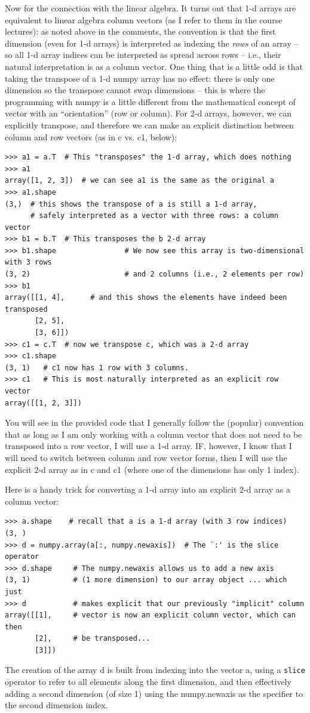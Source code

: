 \documentclass[10pt]{article}
\begin{document}
Now for the connection with the linear algebra.  It turns out that 1-d arrays are equivalent to linear algebra column vectors (as I refer to them in the course lectures): as noted above in the comments, the convention is that the first dimension (even for 1-d arrays) is interpreted as indexing the {\em rows} of an array -- so all 1-d array indices can be interpreted as spread across rows -- i.e., their natural interpretation is as a column vector.  One thing that is a little odd is that taking the transpose of a 1-d numpy array has no effect: there is only one dimension so the transpose cannot swap dimensions -- this is where the programming with numpy is a little different from the mathematical concept of vector with an ``orientation'' (row or column).  For 2-d arrays, however, we can explicitly transpose, and therefore we can make an explicit distinction between column and row vectors (as in c vs. c1, below):
\begin{verbatim}
>>> a1 = a.T  # This "transposes" the 1-d array, which does nothing
>>> a1
array([1, 2, 3])  # we can see a1 is the same as the original a
>>> a1.shape
(3,)  # this shows the transpose of a is still a 1-d array,
      # safely interpreted as a vector with three rows: a column vector
>>> b1 = b.T  # This transposes the b 2-d array
>>> b1.shape                # We now see this array is two-dimensional with 3 rows 
(3, 2)                      # and 2 columns (i.e., 2 elements per row)
>>> b1
array([[1, 4],      # and this shows the elements have indeed been transposed
       [2, 5],
       [3, 6]])
>>> c1 = c.T  # now we transpose c, which was a 2-d array
>>> c1.shape
(3, 1)   # c1 now has 1 row with 3 columns.
>>> c1   # This is most naturally interpreted as an explicit row vector
array([[1, 2, 3]])
\end{verbatim}
You will see in the provided code that I generally follow the (popular) convention that as long as I am only working with a column vector that does not need to be transposed into a row vector, I will use a 1-d array.  IF, however, I know that I will need to switch between column and row vector forms, then I will use the explicit 2-d array as in c and c1 (where one of the dimensions has only 1 index).

Here is a handy trick for converting a 1-d array into an explicit 2-d array as a column vector:
\begin{verbatim}
>>> a.shape    # recall that a is a 1-d array (with 3 row indices)
(3, )
>>> d = numpy.array(a[:, numpy.newaxis])  # The `:' is the slice operator
>>> d.shape     # The numpy.newaxis allows us to add a new axis 
(3, 1)          # (1 more dimension) to our array object ... which just 
>>> d           # makes explicit that our previously "implicit" column 
array([[1],     # vector is now an explicit column vector, which can then
       [2],     # be transposed...
       [3]])
\end{verbatim}
The creation of the array d is built from indexing into the vector a, using a {\tt slice} operator to refer to all elements along the first dimension, and then effectively adding a second dimension (of size 1) using the numpy.newaxis as the specifier to the second dimension index.
\end{document}
